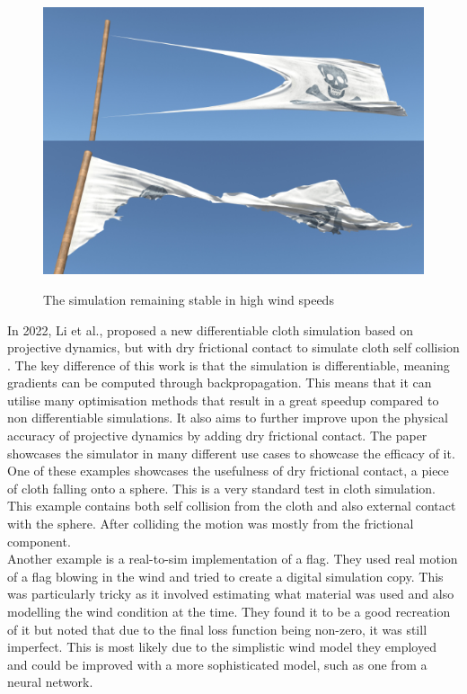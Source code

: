 \documentclass[12pt,a4paper]{article}
\begin{document}
\begin{figure}
	\centering
	\caption{The simulation remaining stable in high wind speeds}
	\includegraphics[scale=0.5]{PDFlag.png}
	\label{fig:pd}
\end{figure}

In 2022, Li et al., proposed a new differentiable cloth simulation based on projective dynamics, but with dry frictional contact to simulate cloth self collision \cite{diffCloth}. The key difference of this work is that the simulation is differentiable, meaning gradients can be computed through backpropagation. This means that it can utilise many optimisation methods that result in a great speedup compared to non differentiable simulations. It also aims to  further improve upon the physical accuracy of projective dynamics by adding dry frictional contact. The paper showcases the simulator in many different use cases to showcase the efficacy of it.
\\
One of these examples showcases the usefulness of dry frictional contact, a piece of cloth falling onto a sphere. This is a very standard test in cloth simulation. This example contains both self collision from the cloth and also external contact with the sphere. After colliding the motion was mostly from the frictional component.
\\

Another example is a real-to-sim implementation of a flag. They used real motion of a flag blowing in the wind and tried to create a digital simulation copy. This was particularly tricky as it involved estimating what material was used and also modelling the wind condition at the time. They found it to be a good recreation of it but noted that due to the final loss function being non-zero, it was still imperfect. This is most likely due to the simplistic wind model they employed and could be improved with a more sophisticated model, such as one from a neural network.
\\
\end{document}

